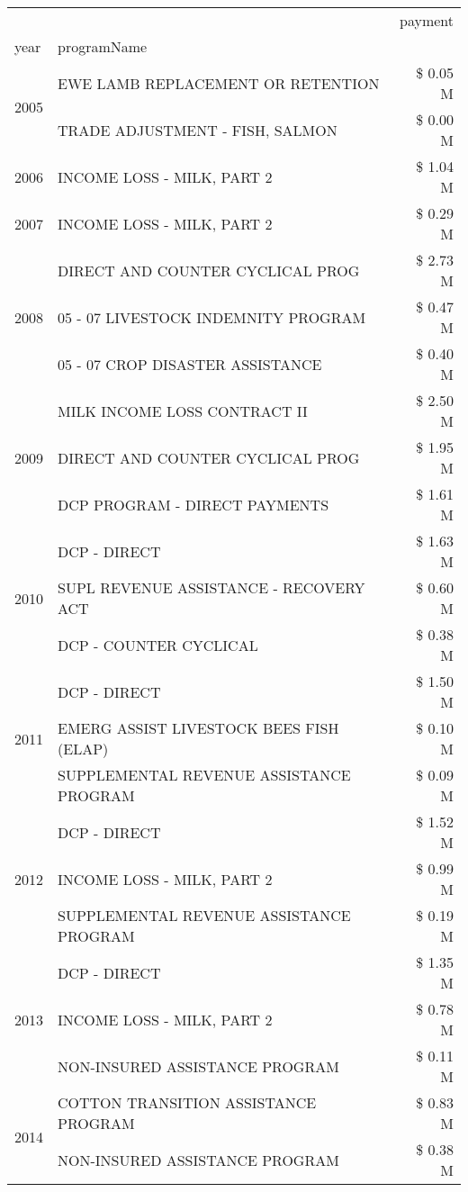 \begin{tabular}{llr}
\toprule
 &  & payment \\
year & programName &  \\
\midrule
\multirow[t]{2}{*}{2005} & EWE LAMB REPLACEMENT OR RETENTION & \$ 0.05 M \\
 & TRADE ADJUSTMENT - FISH, SALMON & \$ 0.00 M \\
\cline{1-3}
2006 & INCOME LOSS - MILK, PART 2 & \$ 1.04 M \\
\cline{1-3}
2007 & INCOME LOSS - MILK, PART 2 & \$ 0.29 M \\
\cline{1-3}
\multirow[t]{3}{*}{2008} & DIRECT AND COUNTER CYCLICAL PROG & \$ 2.73 M \\
 & 05 - 07 LIVESTOCK INDEMNITY PROGRAM & \$ 0.47 M \\
 & 05 - 07 CROP DISASTER ASSISTANCE & \$ 0.40 M \\
\cline{1-3}
\multirow[t]{3}{*}{2009} & MILK INCOME LOSS CONTRACT II & \$ 2.50 M \\
 & DIRECT AND COUNTER CYCLICAL PROG & \$ 1.95 M \\
 & DCP PROGRAM - DIRECT PAYMENTS & \$ 1.61 M \\
\cline{1-3}
\multirow[t]{3}{*}{2010} & DCP - DIRECT & \$ 1.63 M \\
 & SUPL REVENUE ASSISTANCE - RECOVERY ACT & \$ 0.60 M \\
 & DCP - COUNTER CYCLICAL & \$ 0.38 M \\
\cline{1-3}
\multirow[t]{3}{*}{2011} & DCP - DIRECT & \$ 1.50 M \\
 & EMERG ASSIST LIVESTOCK BEES FISH (ELAP) & \$ 0.10 M \\
 & SUPPLEMENTAL REVENUE ASSISTANCE PROGRAM & \$ 0.09 M \\
\cline{1-3}
\multirow[t]{3}{*}{2012} & DCP - DIRECT & \$ 1.52 M \\
 & INCOME LOSS - MILK, PART 2 & \$ 0.99 M \\
 & SUPPLEMENTAL REVENUE ASSISTANCE PROGRAM & \$ 0.19 M \\
\cline{1-3}
\multirow[t]{3}{*}{2013} & DCP - DIRECT & \$ 1.35 M \\
 & INCOME LOSS - MILK, PART 2 & \$ 0.78 M \\
 & NON-INSURED ASSISTANCE PROGRAM & \$ 0.11 M \\
\cline{1-3}
\multirow[t]{3}{*}{2014} & COTTON TRANSITION ASSISTANCE PROGRAM & \$ 0.83 M \\
 & NON-INSURED ASSISTANCE PROGRAM & \$ 0.38 M \\

\end{tabular}
